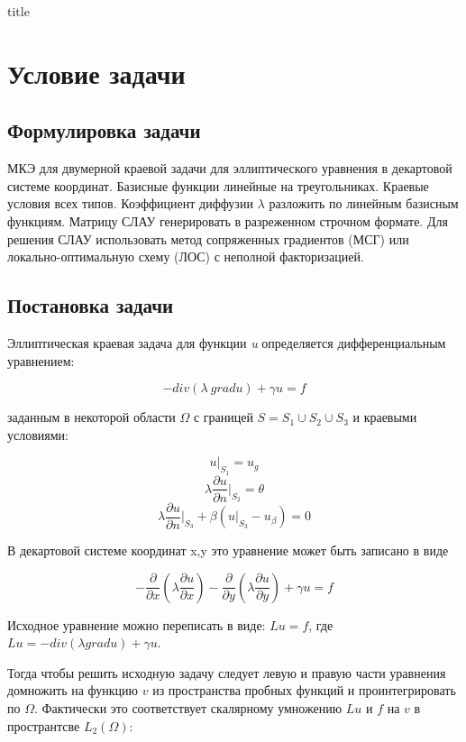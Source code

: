\documentclass[12pt,a4paper]{article}
\begin{document}
{title}

\section{Условие задачи}                %
\subsection*{Формулировка задачи}       %

МКЭ для двумерной краевой задачи для эллиптического уравнения в декартовой системе
координат. Базисные функции линейные на треугольниках. Краевые условия всех типов.
Коэффициент диффузии $\lambda$ разложить по линейным базисным функциям. Матрицу СЛАУ
генерировать в разреженном строчном формате. Для решения СЛАУ использовать метод
сопряженных градиентов (МСГ) или локально-оптимальную схему (ЛОС) с неполной
факторизацией.

\subsection*{Постановка задачи}

Эллиптическая краевая задача для функции \textit{u}
определяется дифференциальным уравнением:

\[ -div( \lambda \ grad u) + \gamma u = f \]

\noindent заданным в некоторой области $\Omega$ с границей
$S=S_1 \cup S_2 \cup S_3$ и краевыми условиями:

\[ u \vert_{S_1} = u_g \]
\[ \lambda \frac{\partial u}{\partial n} \bigg\vert_{S_2} = \theta \]
\[ \lambda \frac{\partial u}{\partial n} \bigg\vert_{S_3}
    + \beta(u \vert_{S_3} - u_{\beta}) = 0 \]

\noindent В декартовой системе координат {x,y} это
уравнение может быть записано в виде

\[ -\frac{\partial}{\partial x}
    \left( \lambda \frac{\partial u}{\partial x} \right)
    -\frac{\partial}{\partial y}
    \left( \lambda \frac{\partial u}{\partial y} \right)
    + \gamma u = f \]

\noindent Исходное уравнение можно переписать
в виде: $Lu = f$, где $Lu = -div( \lambda grad u) + \gamma u$.

\noindent Тогда чтобы решить исходную задачу
следует левую и правую части уравнения домножить
на функцию $v$ из пространства пробных функций
и проинтегрировать по $\Omega$. Фактически это
соответствует скалярному умножению $Lu$ и $f$
на $v$ в пространтсве $L_2(\Omega)$:
\end{document}
